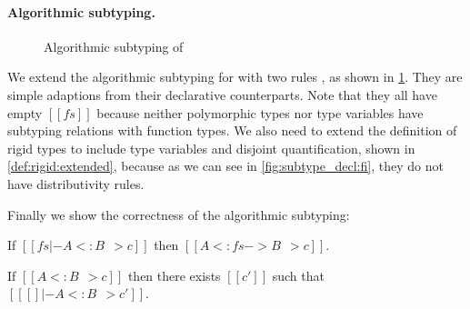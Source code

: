 \paragraph{Algorithmic subtyping.}



\begin{figure}[t]
  \centering
  \caption{Algorithmic subtyping of \fnamee}
  \label{fig:algo:sub:fi}
\end{figure}

We extend the algorithmic subtyping for \namee with two rules
, as shown in \cref{fig:algo:sub:fi}. They are simple
adaptions from their declarative counterparts. Note that they all have empty
$[[fs]]$ because neither polymorphic types nor type variables have subtyping
relations with function types. We also need to extend the definition of rigid
types to include type variables and disjoint quantification, shown in
\cref{def:rigid:extended}, because as we can see in \cref{fig:subtype_decl:fi},
they do not have distributivity rules.

\begin{definition} \label{def:rigid:extended}
\end{definition}

Finally we show the correctness of the algorithmic subtyping:

\begin{conjecture}[Soundness]
  If $[[ fs |- A <: B ~~> c]]$ then $ [[   A <: fs -> B ~~> c  ]]   $.
\end{conjecture}

\begin{conjecture}[Completeness]
  If $[[A <: B ~~> c]]$ then there exists $[[c']]$ such that $[[ [] |- A <: B ~~> c']]$.
\end{conjecture}



